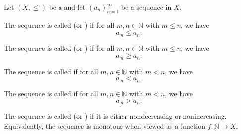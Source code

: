 \begin{definition} \label{definition:monotone_sequence_of_elements_in_a_partially_ordered_set}
    Let $(X, \leq)$ be a  and let $(a_n)_{n=1}^\infty$ be a sequence in $X$.

    The sequence is called  (or ) if for all $m, n \in \mathbb{N}$ with $m \leq n$, we have
    $$a_m \leq a_n.$$

    The sequence is called  (or ) if for all $m, n \in \mathbb{N}$ with $m \leq n$, we have
    $$a_m \geq a_n.$$

    The sequence is called  if for all $m, n \in \mathbb{N}$ with $m < n$, we have
    $$a_m < a_n.$$

    The sequence is called  if for all $m, n \in \mathbb{N}$ with $m < n$, we have
    $$a_m > a_n.$$

    The sequence is called  (or ) if it is either nondecreasing or nonincreasing. Equivalently, the sequence is monotone when viewed as a function $f : \mathbb{N} \to X$.
\end{definition}
